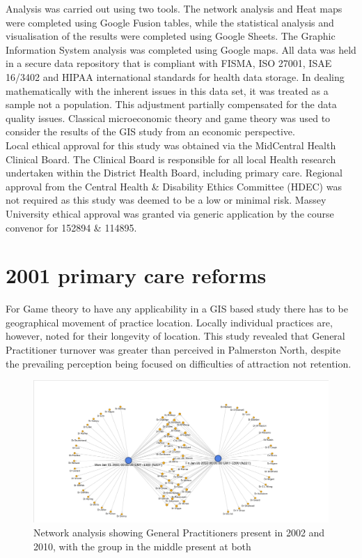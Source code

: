 \documentclass[11pt,a4paper]{article}
\begin{document}
Analysis was carried out using two tools. The network analysis and Heat maps were completed using Google Fusion tables, while the statistical analysis and visualisation of the results were completed using Google Sheets. The Graphic Information System analysis was completed using Google maps. All data was held in a secure data repository that is compliant with FISMA, ISO 27001, ISAE 16/3402 and HIPAA international standards for health data storage. In dealing mathematically  with the inherent issues in this data set, it was treated as a sample not a population. This adjustment partially compensated for the data quality issues. Classical microeconomic theory and game theory was used to consider the results of the GIS study from an economic perspective. \\

Local ethical approval for this study was obtained via the MidCentral Health Clinical Board. The Clinical Board is responsible for all local Health research undertaken within the District Health Board, including primary care.  Regional approval from the Central Health \& Disability Ethics Committee (HDEC) was not required as this study was deemed to be  a low or minimal risk. Massey University ethical approval was granted via generic application by the course convenor for 152894 & 114895. \\

\section{2001 primary care reforms}
For Game theory to have any applicability in a GIS based study there has to be geographical movement of practice location. Locally individual practices are, however,  noted for their longevity of location. This study revealed that General Practitioner turnover was greater than perceived in Palmerston North, despite the prevailing perception being focused on difficulties of attraction not retention. \\

\begin{figure}[htp]
\centering
\includegraphics[scale=0.4]{fig3.png}
\caption{Network analysis showing General Practitioners present in 2002 and 2010, with the group in the middle present at both}
\label{General Practitioners present in 2002 and 2010}
\end{figure}
\end{document}
